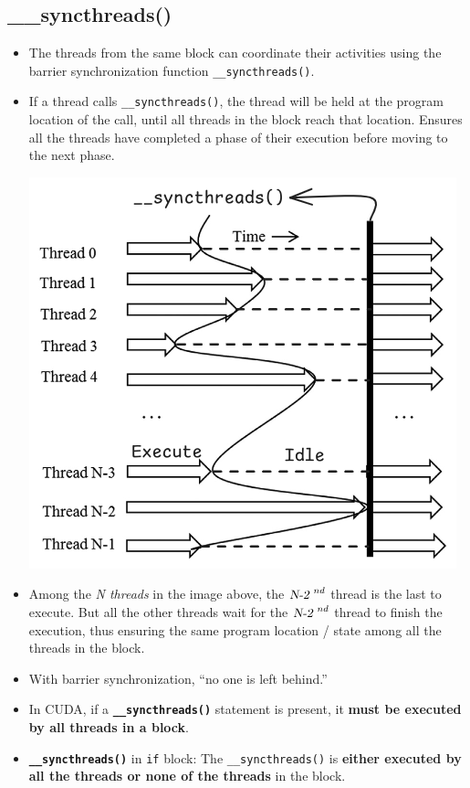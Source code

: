 \subsection{\_\_syncthreads()}
\begin{itemize}
    \item The threads from the same block can coordinate their activities using the barrier synchronization function \texttt{\_\_syncthreads()}.
    \item If a thread calls \texttt{\_\_syncthreads()}, the thread will be held at the program location of the call, until all threads in the block reach that location. Ensures all the threads have completed a phase of their execution before moving to the next phase.
          \begin{center}
              \includegraphics[width=0.7\linewidth]{Images/CompArch/syncthreads.png}
          \end{center}
    \item Among the \textsl{N threads} in the image above, the $\textsl{N-2 }^{nd}$ thread is the last to execute. But all the other threads wait for the $\textsl{N-2 }^{nd}$ thread to finish the execution, thus ensuring the same program location / state among all the threads in the block.
    \item With barrier synchronization, \enquote{no one is left behind.}
    \item In CUDA, if a \textbf{\texttt{\_\_syncthreads()}} statement is present, it \textbf{must be executed by all threads in a block}.
    \item \textbf{\texttt{\_\_syncthreads()}} in \texttt{if} block: The \texttt{\_\_syncthreads()} is \textbf{either executed by all the threads or none of the threads} in the block.

\end{itemize}
